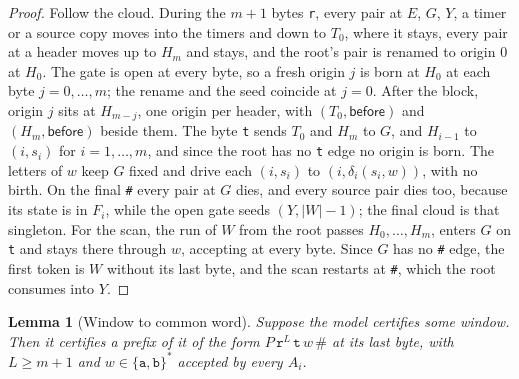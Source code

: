 \documentclass[11pt,a4paper]{article}
\theoremstyle{definition}
\theoremstyle{plain}
\newtheorem{lemma}{Lemma}
\newcommand{\code}[1]{\texttt{#1}}
\newcommand{\before}{\mathsf{before}}
\begin{document}
\begin{proof}
Follow the cloud. During the $m + 1$ bytes \code{r}, every pair at $E$, $G$, $Y$, a timer or a source copy moves into
the timers and down to $T_0$, where it stays, every pair at a header moves up to $H_m$ and stays, and the root's pair is
renamed to origin $0$ at $H_0$. The gate is open at every byte, so a fresh origin $j$ is born at $H_0$ at each byte
$j = 0, \ldots, m$; the rename and the seed coincide at $j = 0$. After the block, origin $j$ sits at $H_{m-j}$, one
origin per header, with $(T_0, \before)$ and $(H_m, \before)$ beside them. The byte \code{t} sends $T_0$ and $H_m$ to
$G$, and $H_{i-1}$ to $(i, s_i)$ for $i = 1, \ldots, m$, and since the root has no \code{t} edge no origin is born. The
letters of $w$ keep $G$ fixed and drive each $(i, s_i)$ to $(i, \delta_i(s_i, w))$, with no birth. On the final
\code{\#} every pair at $G$ dies, and every source pair dies too, because its state is in $F_i$, while the open gate
seeds $(Y, |W| - 1)$; the final cloud is that singleton. For the scan, the run of $W$ from the root passes
$H_0, \ldots, H_m$, enters $G$ on \code{t} and stays there through $w$, accepting at every byte. Since $G$ has no
\code{\#} edge, the first token is $W$ without its last byte, and the scan restarts at \code{\#}, which the root
consumes into $Y$.
\end{proof}

\begin{lemma}[Window to common word]
\label{lem:reduction-back}
Suppose the model certifies some window. Then it certifies a prefix of it of the form
$P\, \code{r}^{L}\, \code{t}\, w\, \code{\#}$ at its last byte, with $L \geq m + 1$ and $w \in \{\code{a}, \code{b}\}^*$
accepted by every $A_i$.
\end{lemma}
\end{document}
